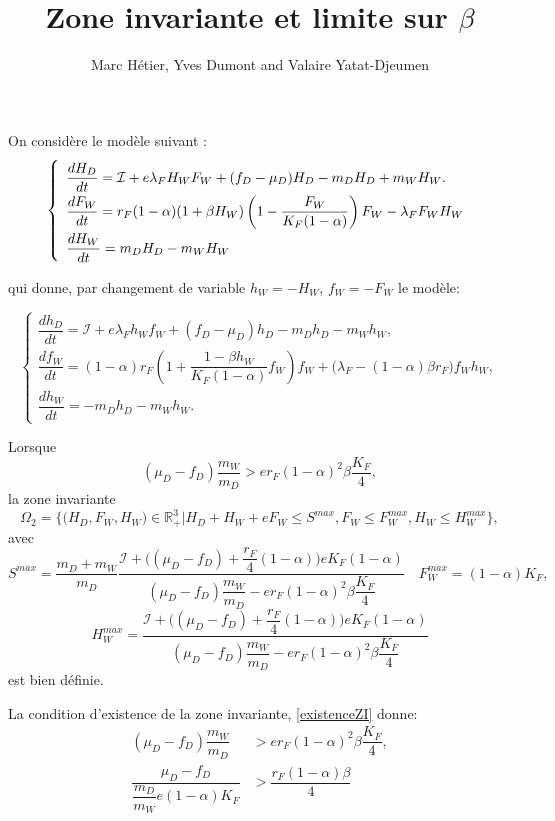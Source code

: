 \documentclass{article}
\title{Zone invariante et limite sur $\beta$ }
\author{Marc Hétier, Yves Dumont  and Valaire Yatat-Djeumen}
\newcommand{\lfw}{\lambda_{F}}
\newcommand{\lfw}{\lambda_{F}}
\newcommand{\cI}{\mathcal{I}}
\begin{document}
\maketitle
On considère le modèle suivant :
\begin{equation}
\def\arraystretch{2}
\left\{ 
\begin{array}{l}
\dfrac{dH_D}{dt}= \cI + e\lfw H_W F_W + (f_D - \mu_D) H_D - m_D H_D + m_W H_W. \\
\dfrac{dF_W}{dt} = r_F(1- \alpha) (1+ \beta H_W) \left(1 - \dfrac{F_W}{K_F(1-\alpha)} \right) F_W - \lfw F_W H_W \\
\dfrac{dH_W}{dt}= m_D H_D - m_W H_W 
\end{array} \right.
\label{equationsHDFWHW}
\end{equation}

qui donne, par changement de variable $h_W = -H_W$, $f_W = -F_W$ le modèle:


\begin{equation}
\left\{ \begin{array}{l}
\dfrac{dh_D}{dt}= \cI + e\lfw h_W f_W + (f_D - \mu_D) h_D - m_D h_D - m_W h_W, \\
\dfrac{df_W}{dt} = (1-\alpha)r_F \left(1 + \dfrac{1 - \beta h_W}{K_F(1-\alpha)}f_W \right) f_W + \Big(\lfw - (1-\alpha)\beta r_F \Big) f_W h_W, \\
\dfrac{dh_W}{dt}= -m_D h_D - m_W h_W.
\end{array} \right.
\label{equationshDfWhW}
\end{equation}


Lorsque 
\begin{equation}
(\mu_D - f_D) \dfrac{m_W}{m_D} > er_F (1-\alpha)^2 \beta \dfrac{K_F}{4},
\label{existenceZI}
\end{equation}
la zone invariante $$\Omega_2 = \Big\{\Big(H_D, F_W, H_W \Big) \in \mathbb{R}_+^3  \Big|H_D + H_W + eF_W \leq S^{max}, F_W \leq F_W^{max}, H_W \leq H_W^{max} \Big\},$$
 avec
$$
S^{max} = \dfrac{m_D + m_W}{m_D} \dfrac{\cI + \Big((\mu_D-f_D) + \dfrac{r_F}{4}(1-\alpha) \Big) e K_F (1-\alpha)}{(\mu_D - f_D) \dfrac{m_W}{m_D} - er_F(1-\alpha)^2 \beta \dfrac{K_F}{4}}
\quad
F_W^{max} = (1-\alpha)K_F,
$$
$$
H_W^{max} = \dfrac{\cI + \Big((\mu_D-f_D) + \dfrac{r_F}{4}(1-\alpha) \Big) e K_F (1-\alpha)}{(\mu_D - f_D) \dfrac{m_W}{m_D} - er_F(1-\alpha)^2 \beta \dfrac{K_F}{4}}
$$
est bien définie.


La condition d'existence  de la zone invariante, \eqref{existenceZI} donne:
\begin{align*}
(\mu_D - f_D) \dfrac{m_W}{m_D} &> er_F (1-\alpha)^2 \beta \dfrac{K_F}{4}, \\
\dfrac{\mu_D - f_D}{\dfrac{m_D}{m_W} e(1-\alpha) K_F } &> \dfrac{r_F (1-\alpha) \beta}{4}
\end{align*}
\end{document}
